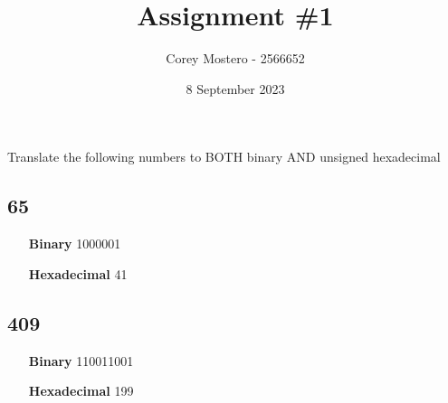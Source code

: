 \documentclass{article}
\title{Assignment \#1}
\author{Corey Mostero - 2566652}
\date{8 September 2023}
\begin{document}
\newcommand{\hr}{\par\noindent\rule{\textwidth}{0.4pt}}

\newcommand{\bc}[1]{
	\begin{equation*}
		\begin{boxed}
			{#1}
		\end{boxed}
	\end{equation*}
}

\newcommand{\cond}[2]{
	\ifmmode
		{#1} \quad {#2}
	\else
		$$ {#1} \quad {#2} $$
	\fi
}

\newcommand{\matr}[1]{
	\ifmmode \bm{#1}
	\else \textit{\textbf{#1}}
	\fi
}
\newcommand{\vect}[1]{
	\ifmmode \mathbf{#1}
	\else \textbf{#1}
	\fi
}


\maketitle
\newpage

\tableofcontents

\section{}
Translate the following numbers to BOTH binary AND unsigned hexadecimal

\subsection{65}
\begin{itemize}
	\item[\textbf{Binary}] 1000001
	\item[\textbf{Hexadecimal}] 41
\end{itemize}

\subsection{409}
\begin{itemize}
	\item[\textbf{Binary}] 110011001
	\item[\textbf{Hexadecimal}] 199
\end{itemize}
\end{document}
